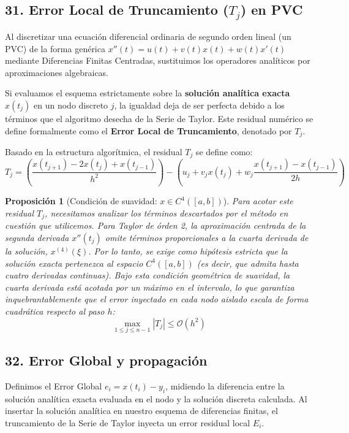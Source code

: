 \documentclass[12pt]{article}
\newtheorem{proposicion}{Proposición}
\begin{document}
\subsection*{31. Error Local de Truncamiento ($T_j$) en PVC}

Al discretizar una ecuación diferencial ordinaria de segundo orden lineal (un PVC) de la forma genérica $x''(t) = u(t) + v(t)x(t) + w(t)x'(t)$ mediante Diferencias Finitas Centradas, sustituimos los operadores analíticos por aproximaciones algebraicas.

Si evaluamos el esquema estrictamente sobre la \textbf{solución analítica exacta} $x(t_j)$ en un nodo discreto $j$, la igualdad deja de ser perfecta debido a los términos que el algoritmo desecha de la Serie de Taylor. Este residual numérico se define formalmente como el \textbf{Error Local de Truncamiento}, denotado por $T_j$.

Basado en la estructura algorítmica, el residual $T_j$ se define como:
\begin{equation}
    T_j = \left( \frac{x(t_{j+1}) - 2x(t_j) + x(t_{j-1})}{h^2} \right) - \left( u_j + v_j x(t_j) + w_j \frac{x(t_{j+1}) - x(t_{j-1})}{2h} \right)
\end{equation}

\begin{proposicion} [Condición de suavidad: $x \in C^4{([a,b])}$]               
Para acotar este residual $T_j$, necesitamos analizar los términos descartados por el método en cuestión que utilicemos. Para Taylor de órden 2, la aproximación centrada de la segunda derivada $x''(t_j)$ omite términos proporcionales a la cuarta derivada de la solución, $x^{(4)}(\xi)$. 
Por lo tanto, se exige como hipótesis estricta que la solución exacta pertenezca al espacio $C^4([a,b])$ (es decir, que admita hasta cuatro derivadas continuas). Bajo esta condición geométrica de suavidad, la cuarta derivada está acotada por un máximo en el intervalo, lo que garantiza inquebrantablemente que el error inyectado en cada nodo aislado escala de forma cuadrática respecto al paso $h$:
\begin{equation}
    \max_{1 \le j \le n-1} |T_j| \le \mathcal{O}(h^2)
\end{equation}
\end{proposicion}

\subsection*{32. Error Global y propagación}
Definimos el Error Global $e_i = x(t_i) - y_i$, midiendo la diferencia entre la solución analítica exacta evaluada en el nodo y la solución discreta calculada. Al insertar la solución analítica en nuestro esquema de diferencias finitas, el truncamiento de la Serie de Taylor inyecta un error residual local $E_i$.
\end{document}
